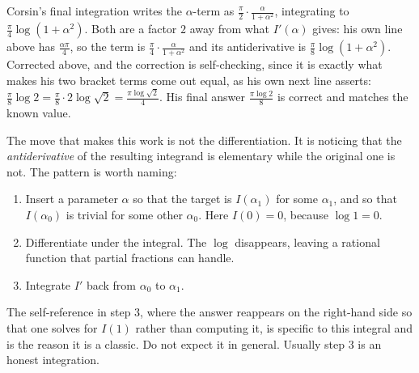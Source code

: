 \begin{ainote}
Corsin's final integration writes the $\alpha$-term as
$\tfrac{\pi}{2}\cdot\tfrac{\alpha}{1+\alpha^2}$, integrating to $\tfrac{\pi}{4}\log(1+\alpha^2)$.
Both are a factor $2$ away from what $I'(\alpha)$ gives: his own line above has
$\tfrac{\alpha\pi}{4}$, so the term is $\tfrac{\pi}{4}\cdot\tfrac{\alpha}{1+\alpha^2}$ and its
antiderivative is $\tfrac{\pi}{8}\log(1+\alpha^2)$. Corrected above, and the correction is
self-checking, since it is exactly what makes his two bracket terms come out equal, as his own
next line asserts:
$\tfrac{\pi}{8}\log 2 = \tfrac{\pi}{8}\cdot 2\log\sqrt2 = \tfrac{\pi\log\sqrt2}{4}$. His final
answer $\tfrac{\pi\log 2}{8}$ is correct and matches the known value.
\end{ainote}

\begin{ainote}
The move that makes this work is not the differentiation. It is noticing that the
\emph{antiderivative} of the resulting integrand is elementary while the original one is not.
The pattern is worth naming:
\begin{enumerate}[label=\textbf{(\alph*)}]
  \item Insert a parameter $\alpha$ so that the target is $I(\alpha_1)$ for some
    $\alpha_1$, and so that $I(\alpha_0)$ is trivial for some other $\alpha_0$. Here
    $I(0)=0$, because $\log 1 = 0$.
  \item Differentiate under the integral. The $\log$ disappears, leaving a rational function
    that partial fractions can handle.
  \item Integrate $I'$ back from $\alpha_0$ to $\alpha_1$.
\end{enumerate}
The self-reference in step 3, where the answer reappears on the right-hand side so that one
solves for $I(1)$ rather than computing it, is specific to this integral and is the reason it
is a classic. Do not expect it in general. Usually step 3 is an honest integration.
\end{ainote}


